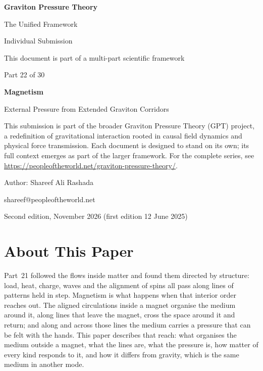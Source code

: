\documentclass[11pt,a4paper]{article}
\begin{document}
\renewcommand{\thetable}{22.\arabic{table}}
\begin{titlepage}
\centering
\vspace*{1.5cm}
{\Huge\bfseries Graviton Pressure Theory\par}
\vspace{0.4cm}
{\Large The Unified Framework\par}
{\large Individual Submission\par}
\vspace{0.3cm}
{\normalsize This document is part of a multi-part scientific framework\par}
\vspace{1.6cm}
{\large Part 22 of 30\par}
\vspace{0.6cm}
{\huge\bfseries Magnetism\par}
\vspace{0.5cm}
{\Large External Pressure from Extended Graviton Corridors\par}
\vspace{1.4cm}
\begin{minipage}{0.82\textwidth}\centering\small
This submission is part of the broader Graviton Pressure Theory (GPT) project, a redefinition of gravitational interaction rooted in causal field dynamics and physical force transmission. Each document is designed to stand on its own; its full context emerges as part of the larger framework. For the complete series, see \url{https://peopleoftheworld.net/graviton-pressure-theory/}.
\end{minipage}
\vfill
{\large Author: Shareef Ali Rashada\par}
{\normalsize shareef@peopleoftheworld.net\par}
\vspace{0.3cm}
{\normalsize Second edition, November 2026 \quad (first edition 12 June 2025)\par}
\end{titlepage}

\tableofcontents
\newpage

\section*{About This Paper}

Part~21 followed the flows inside matter and found them directed by structure: load, heat, charge, waves and the alignment of spins all pass along lines of patterns held in step. Magnetism is what happens when that interior order reaches out. The aligned circulations inside a magnet organise the medium around it, along lines that leave the magnet, cross the space around it and return; and along and across those lines the medium carries a pressure that can be felt with the hands. This paper describes that reach: what organises the medium outside a magnet, what the lines are, what the pressure is, how matter of every kind responds to it, and how it differs from gravity, which is the same medium in another mode.
\end{document}
